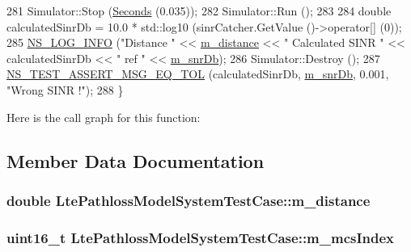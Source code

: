 \begin{DoxyCode}
281   Simulator::Stop (\hyperlink{group__timecivil_ga33c34b816f8ff6628e33d5c8e9713b9e}{Seconds} (0.035));
282   Simulator::Run ();
283   
284   \textcolor{keywordtype}{double} calculatedSinrDb = 10.0 * std::log10 (sinrCatcher.GetValue ()->operator[] (0));
285   \hyperlink{group__logging_gafbd73ee2cf9f26b319f49086d8e860fb}{NS\_LOG\_INFO} (\textcolor{stringliteral}{"Distance "} << \hyperlink{classLtePathlossModelSystemTestCase_a445b7e83af806458e058bbc1b8fa692f}{m\_distance} << \textcolor{stringliteral}{" Calculated SINR "} << calculatedSinrDb <<
       \textcolor{stringliteral}{" ref "} << \hyperlink{classLtePathlossModelSystemTestCase_a35c21405e185bd4b200a8d2d14f683b3}{m\_snrDb});
286   Simulator::Destroy ();
287   \hyperlink{group__testing_ga9e7861b56b4e70db3b56044cb7a28e41}{NS\_TEST\_ASSERT\_MSG\_EQ\_TOL} (calculatedSinrDb, \hyperlink{classLtePathlossModelSystemTestCase_a35c21405e185bd4b200a8d2d14f683b3}{m\_snrDb}, 0.001, \textcolor{stringliteral}{"Wrong SINR
       !"});
288 \}
\end{DoxyCode}


Here is the call graph for this function\+:




\subsection{Member Data Documentation}
\subsubsection[{\texorpdfstring{m\+\_\+distance}{m_distance}}]{\setlength{\rightskip}{0pt plus 5cm}double Lte\+Pathloss\+Model\+System\+Test\+Case\+::m\+\_\+distance\hspace{0.3cm}{\ttfamily [private]}}\hypertarget{classLtePathlossModelSystemTestCase_a445b7e83af806458e058bbc1b8fa692f}{}\label{classLtePathlossModelSystemTestCase_a445b7e83af806458e058bbc1b8fa692f}
\subsubsection[{\texorpdfstring{m\+\_\+mcs\+Index}{m_mcsIndex}}]{\setlength{\rightskip}{0pt plus 5cm}uint16\+\_\+t Lte\+Pathloss\+Model\+System\+Test\+Case\+::m\+\_\+mcs\+Index\hspace{0.3cm}{\ttfamily [private]}}\hypertarget{classLtePathlossModelSystemTestCase_af9c97e7f7e20f6b48c86de67a1de23ec}{}\label{classLtePathlossModelSystemTestCase_af9c97e7f7e20f6b48c86de67a1de23ec}

